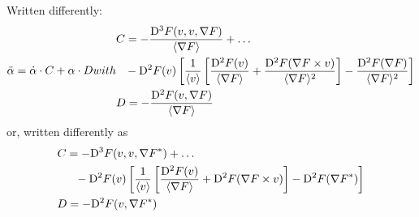 Written differently:
\begin{subequations}
    \begin{align}
        \ddot{ \alpha }   =   \dot{ \alpha } \mult C  +  \alpha \mult D
    \end{align}
    with
    \begin{align}
        &\begin{aligned}
            C   &=
            - \frac{ \diff{3}{F}( v, v, \grad{F} ) }{ \skaq{\grad{F}} }  +  \dots \\
            &- \diff{2}{F}( v )
            \left[ \frac{ 1 }{ \skaq{v} }
            \left[ \frac{ \diff{2}{F}( v ) }{ \skaq{\grad{F}} }  +
            \frac{ \diff{2}{F}( \grad{F} \times v ) }{ \skaq{\grad{F}}^2 } \right]  -
            \frac{ \diff{2}{F}( \grad{F} ) }{ \skaq{\grad{F}}^2 } \right]
        \end{aligned}\\
        &D   =   - \frac{ \diff{2}{F}( v, \grad{F} ) }{ \skaq{\grad{F}} }
    \end{align}
\end{subequations}
or, written differently as
\begin{subequations}
    \begin{align}
        &\begin{aligned}
            C   &=
            - \mathrm{D}^{ 3 }F( v, v, {\nabla F}^* )  +  \dots \\
            &\hphantom{=}-\mathrm{D}^{ 2 }F( v )
            \left[ \frac{ 1 }{ \langle v \rangle }
            \left[ \frac{ \mathrm{D}^{ 2 }F( v ) }{ \langle \nabla F \rangle }  +
            \mathrm{D}^{ 2 }F( \nabla F \times v ) \right]  -
            \mathrm{D}^{ 2 }F( {\nabla F}^* ) \right]
        \end{aligned}\\
        &D   =   - \mathrm{D}^{ 2 }F( v, {\nabla F}^* )
    \end{align}
\end{subequations}



